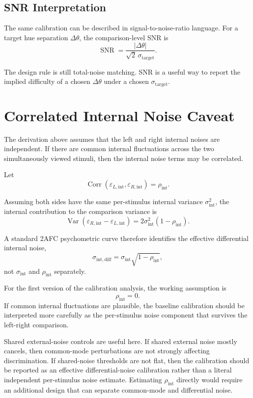 \documentclass[11pt]{article}
\begin{document}
\subsection{SNR Interpretation}

The same calibration can be described in signal-to-noise-ratio language. For
a target hue separation $\Delta\theta$, the comparison-level SNR is
\[
\operatorname{SNR}
= \frac{|\Delta\theta|}{\sqrt{2}\,\sigma_{\mathrm{target}}}.
\]

The design rule is still total-noise matching. SNR is a useful way to report
the implied difficulty of a chosen $\Delta\theta$ under a chosen
$\sigma_{\mathrm{target}}$.

\section{Correlated Internal Noise Caveat}

The derivation above assumes that the left and right internal noises are
independent. If there are common internal fluctuations across the two
simultaneously viewed stimuli, then the internal noise terms may be correlated.

Let
\[
\operatorname{Corr}(
\varepsilon_{L,\mathrm{int}},
\varepsilon_{R,\mathrm{int}}
) = \rho_{\mathrm{int}}.
\]

Assuming both sides have the same per-stimulus internal variance
$\sigma_{\mathrm{int}}^2$, the internal contribution to the comparison
variance is
\[
\operatorname{Var}(
\varepsilon_{R,\mathrm{int}} - \varepsilon_{L,\mathrm{int}}
)
= 2\sigma_{\mathrm{int}}^2(1-\rho_{\mathrm{int}}).
\]

A standard 2AFC psychometric curve therefore identifies the effective
differential internal noise,
\[
\sigma_{\mathrm{int,diff}}
= \sigma_{\mathrm{int}}\sqrt{1-\rho_{\mathrm{int}}},
\]
not $\sigma_{\mathrm{int}}$ and $\rho_{\mathrm{int}}$ separately.

For the first version of the calibration analysis, the working assumption is
\[
\rho_{\mathrm{int}} = 0.
\]
If common internal fluctuations are plausible, the baseline calibration should
be interpreted more carefully as the per-stimulus noise component that
survives the left-right comparison.

Shared external-noise controls are useful here. If shared external noise
mostly cancels, then common-mode perturbations are not strongly affecting
discrimination. If shared-noise thresholds are not flat, then the calibration
should be reported as an effective differential-noise calibration rather than
a literal independent per-stimulus noise estimate. Estimating
$\rho_{\mathrm{int}}$ directly would require an additional design that can
separate common-mode and differential noise.
\end{document}
